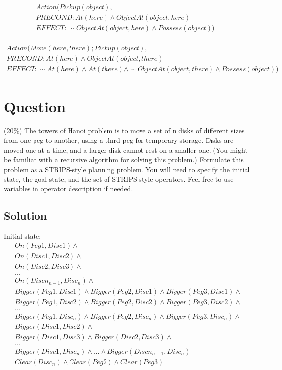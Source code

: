 \documentclass[10pt]{article}
\begin{document}
\begin{eqnarray}
Action( Pickup(object), &\\
PRECOND: At(here) \wedge ObjectAt(object, here) &\\
EFFECT: \sim ObjectAt(object, here) \wedge Possess(object) )&\\
\end{eqnarray}

\begin{eqnarray}
Action( Move(here,there);Pickup(object), &\\
PRECOND: At(here) \wedge ObjectAt(object, there) &\\
EFFECT: \sim At(here) \wedge At(there) \wedge \sim ObjectAt(object, there) \wedge Possess(object) )&\\
\end{eqnarray}

\section{Question} 
 (20\%) The towers of Hanoi problem is to move a set of n disks of different sizes from one peg to another, using a third peg for temporary storage. Disks are moved one at a time, and a larger disk cannot rest on a smaller one. (You might be familiar with a recursive algorithm for solving this problem.) Formulate this problem as a STRIPS-style planning problem. You will need to specify the initial state, the goal state, and the set of STRIPS-style operators. Feel free to use variables in operator description if needed.

\subsection{Solution}

Initial state:
\begin{eqnarray}
On(Peg1, Disc1) \wedge \\
On(Disc1, Disc2) \wedge \\
On(Disc2, Disc3) \wedge \\
...\\
On(Discn_{n-1}, Disc_{n}) \wedge \\
Bigger(Peg1, Disc1) \wedge Bigger(Peg2, Disc1) \wedge Bigger(Peg3, Disc1) \wedge \\
Bigger(Peg1, Disc2) \wedge Bigger(Peg2, Disc2) \wedge Bigger(Peg3, Disc2) \wedge \\
...\\
Bigger(Peg1, Disc_{n}) \wedge Bigger(Peg2, Disc_{n}) \wedge Bigger(Peg3, Disc_{n}) \wedge \\
Bigger(Disc1, Disc2) \wedge \\
Bigger(Disc1, Disc3) \wedge Bigger(Disc2, Disc3) \wedge\\
...\\
Bigger(Disc1, Disc_{n}) \wedge ... \wedge Bigger(Discn_{n-1}, Disc_{n})\\
Clear(Disc_{n}) \wedge Clear(Peg2) \wedge Clear (Peg3)\\
\end{eqnarray}
\end{document}
